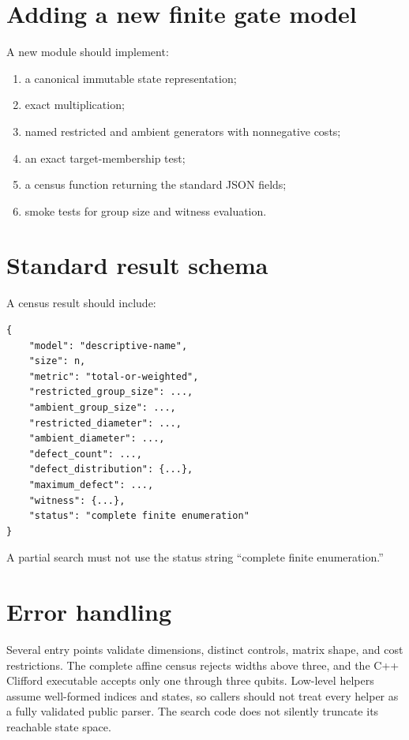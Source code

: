 \section{Adding a new finite gate model}
A new module should implement:
\begin{enumerate}
\item a canonical immutable state representation;
\item exact multiplication;
\item named restricted and ambient generators with nonnegative costs;
\item an exact target-membership test;
\item a census function returning the standard JSON fields;
\item smoke tests for group size and witness evaluation.
\end{enumerate}

\section{Standard result schema}
A census result should include:
\begin{lstlisting}[style=pythonstyle]
{
    "model": "descriptive-name",
    "size": n,
    "metric": "total-or-weighted",
    "restricted_group_size": ...,
    "ambient_group_size": ...,
    "restricted_diameter": ...,
    "ambient_diameter": ...,
    "defect_count": ...,
    "defect_distribution": {...},
    "maximum_defect": ...,
    "witness": {...},
    "status": "complete finite enumeration"
}
\end{lstlisting}
A partial search must not use the status string ``complete finite enumeration.''

\section{Error handling}
Several entry points validate dimensions, distinct controls, matrix shape, and cost restrictions.  The complete affine census rejects widths above three, and the C++ Clifford executable accepts only one through three qubits.  Low-level helpers assume well-formed indices and states, so callers should not treat every helper as a fully validated public parser.  The search code does not silently truncate its reachable state space.
